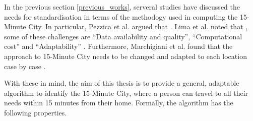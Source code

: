In the previous section \ref{previous_works}, serveral studies have discussed the needs for standardisation in terms of the methodogy used in computing the 15-Minute City. In particular, Pezzica et al. argued that  \cite{Pezzica_Altafini_Mara_Chioni_2024}. Lima et al. noted that , some of these challenges are “Data availability and quality”, “Computational cost” and “Adaptability” \cite{lima_quest_2023}. Furthermore, Marchigiani et al. found that the approach to 15-Minute City needs to be changed and adapted to each location case by case \cite{marchigiani_urban_2022}.

With these in mind, the aim of this thesis is to provide a general, adaptable algorithm to identify the 15-Minute City, where a person can travel to all their needs within 15 minutes from their home. Formally, the algorithm has the following properties.

